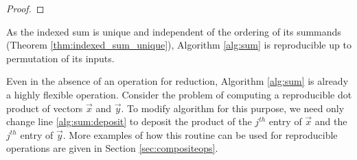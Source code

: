 \begin{proof}
\begin{comment}
      In either case, the ``Require'' clause of Algorithm \ref{alg:update} is satisfied. Therefore, after executing line \ref{alg:sum:update}, the following statements hold:
      \begin{enumerate}
      \item
        The index of $Y$ is $I$ where $I$ is the greatest integer such that $\max(|x_0|, ..., |x_{m - 1}|) < 2^{b_I}$
      \item
        $\mathcal{Y}_k = d(x_0, I + k) + ... + d(x_{j - 1}, I + k)$
      \item
        \Statex ${Y_k}_P \in [1.5  \epsilon^{-1} 2^{a_{I + k}}, 1.75  \epsilon^{-1} 2^{a_{I + k}})$ unless $I + k = 0$, in which case ${Y_0}_P \in (2^{e_{\max}}, 2 \cdot 2^{e_{\max}})$
      \end{enumerate}
      Between lines \ref{alg:sum:innerloop} and \ref{alg:sum:innerloopend}, at most $0.25\epsilon^{-1}2^{-W}$ calls to \ref{alg:sum:deposit} are made, and by Theorem \ref{thm:depositfreq}, and the above initial properties, the requirements of Algorithm \ref{alg:deposit} are met at each call. Therefore, after line \ref{alg:sum:innerloopend}, we have that $\mathcal{Y}_k = d(x_0, I + k) + ... + d(x_{j-1}, I + k)$.

      Again by Theorem \ref{thm:depositfreq}, the requirements of Algorithm \ref{alg:renorm} are met in line \ref{alg:sum:renorm}. Therefore, after execution of line \ref{alg:sum:renorm}, we have that ${Y_k}_P \in [1.5  \epsilon^{-1} 2^{a_{I + k}}, 1.75  \epsilon^{-1} 2^{a_{I + k}})$ unless $I + k = 0$, in which case ${Y_0}_P \in (1.5 \cdot 2^{e_{\max}}, 1.75 \cdot 2^{e_{\max}})$. Therefore, $Y$ is the indexed sum of $x_0, ..., x_{j - 1}$ after line \ref{alg:sum:renorm}, completing the induction.
      \end{comment}
    \end{proof}
    As the indexed sum is unique and independent of the ordering of its summands (Theorem \ref{thm:indexed_sum_unique}), Algorithm \ref{alg:sum} is reproducible up to permutation of its inputs.

    Even in the absence of an operation for reduction, Algorithm \ref{alg:sum} is already a highly flexible operation.
    Consider the problem of computing a reproducible dot product of vectors $\vec{x}$ and $\vec{y}$. To modify algorithm for this purpose, we need only change line \ref{alg:sum:deposit} to deposit the product of the $j^{th}$ entry of $\vec{x}$ and the $j^{th}$ entry of $\vec{y}$. More examples of how this routine can be used for reproducible operations are given in Section \ref{sec:compositeops}.

